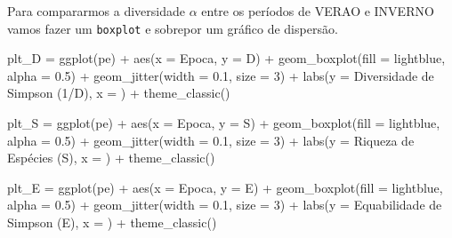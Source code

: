 \documentclass[
]{book}
\newenvironment{Shaded}{\begin{snugshade}}{\end{snugshade}}
\newcommand{\AttributeTok}[1]{\textcolor[rgb]{0.77,0.63,0.00}{#1}}
\newcommand{\DecValTok}[1]{\textcolor[rgb]{0.00,0.00,0.81}{#1}}
\newcommand{\FloatTok}[1]{\textcolor[rgb]{0.00,0.00,0.81}{#1}}
\newcommand{\FunctionTok}[1]{\textcolor[rgb]{0.00,0.00,0.00}{#1}}
\newcommand{\NormalTok}[1]{#1}
\newcommand{\OtherTok}[1]{\textcolor[rgb]{0.56,0.35,0.01}{#1}}
\newcommand{\SpecialCharTok}[1]{\textcolor[rgb]{0.00,0.00,0.00}{#1}}
\newcommand{\StringTok}[1]{\textcolor[rgb]{0.31,0.60,0.02}{#1}}
\begin{document}
Para compararmos a diversidade \(\alpha\) entre os períodos de VERAO e INVERNO vamos fazer um \texttt{boxplot} e sobrepor um gráfico de dispersão.

\begin{Shaded}
\begin{Highlighting}[]
\NormalTok{plt\_D }\OtherTok{=} \FunctionTok{ggplot}\NormalTok{(pe) }\SpecialCharTok{+}
  \FunctionTok{aes}\NormalTok{(}\AttributeTok{x =}\NormalTok{ Epoca, }\AttributeTok{y =}\NormalTok{ D) }\SpecialCharTok{+}
  \FunctionTok{geom\_boxplot}\NormalTok{(}\AttributeTok{fill =} \StringTok{\textquotesingle{}lightblue\textquotesingle{}}\NormalTok{, }\AttributeTok{alpha =} \FloatTok{0.5}\NormalTok{) }\SpecialCharTok{+}
  \FunctionTok{geom\_jitter}\NormalTok{(}\AttributeTok{width =} \FloatTok{0.1}\NormalTok{, }\AttributeTok{size =} \DecValTok{3}\NormalTok{) }\SpecialCharTok{+}
  \FunctionTok{labs}\NormalTok{(}\AttributeTok{y =} \StringTok{\textquotesingle{}Diversidade de Simpson (1/D)\textquotesingle{}}\NormalTok{, }
        \AttributeTok{x =} \StringTok{\textquotesingle{}\textquotesingle{}}\NormalTok{) }\SpecialCharTok{+}
  \FunctionTok{theme\_classic}\NormalTok{()}

\NormalTok{plt\_S }\OtherTok{=} \FunctionTok{ggplot}\NormalTok{(pe) }\SpecialCharTok{+}
  \FunctionTok{aes}\NormalTok{(}\AttributeTok{x =}\NormalTok{ Epoca, }\AttributeTok{y =}\NormalTok{ S) }\SpecialCharTok{+}
  \FunctionTok{geom\_boxplot}\NormalTok{(}\AttributeTok{fill =} \StringTok{\textquotesingle{}lightblue\textquotesingle{}}\NormalTok{, }\AttributeTok{alpha =} \FloatTok{0.5}\NormalTok{) }\SpecialCharTok{+}
  \FunctionTok{geom\_jitter}\NormalTok{(}\AttributeTok{width =} \FloatTok{0.1}\NormalTok{, }\AttributeTok{size =} \DecValTok{3}\NormalTok{) }\SpecialCharTok{+}
  \FunctionTok{labs}\NormalTok{(}\AttributeTok{y =} \StringTok{\textquotesingle{}Riqueza de Espécies (S)\textquotesingle{}}\NormalTok{, }
        \AttributeTok{x =} \StringTok{\textquotesingle{}\textquotesingle{}}\NormalTok{) }\SpecialCharTok{+}
  \FunctionTok{theme\_classic}\NormalTok{()}

\NormalTok{plt\_E }\OtherTok{=} \FunctionTok{ggplot}\NormalTok{(pe) }\SpecialCharTok{+}
  \FunctionTok{aes}\NormalTok{(}\AttributeTok{x =}\NormalTok{ Epoca, }\AttributeTok{y =}\NormalTok{ E) }\SpecialCharTok{+}
  \FunctionTok{geom\_boxplot}\NormalTok{(}\AttributeTok{fill =} \StringTok{\textquotesingle{}lightblue\textquotesingle{}}\NormalTok{, }\AttributeTok{alpha =} \FloatTok{0.5}\NormalTok{) }\SpecialCharTok{+}
  \FunctionTok{geom\_jitter}\NormalTok{(}\AttributeTok{width =} \FloatTok{0.1}\NormalTok{, }\AttributeTok{size =} \DecValTok{3}\NormalTok{) }\SpecialCharTok{+}
  \FunctionTok{labs}\NormalTok{(}\AttributeTok{y =} \StringTok{\textquotesingle{}Equabilidade de Simpson (E)\textquotesingle{}}\NormalTok{, }
        \AttributeTok{x =} \StringTok{\textquotesingle{}\textquotesingle{}}\NormalTok{) }\SpecialCharTok{+}
  \FunctionTok{theme\_classic}\NormalTok{()}
\end{Highlighting}
\end{Shaded}
\end{document}
